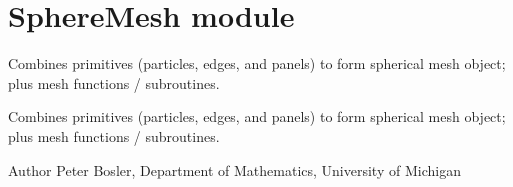 \hypertarget{group__SphereMesh}{\section{Sphere\+Mesh module}
\label{group__SphereMesh}
}


Combines primitives (particles, edges, and panels) to form spherical mesh object; plus mesh functions / subroutines.  


Combines primitives (particles, edges, and panels) to form spherical mesh object; plus mesh functions / subroutines. 

\begin{DoxyAuthor}{Author}
Peter Bosler, Department of Mathematics, University of Michigan 
\end{DoxyAuthor}
